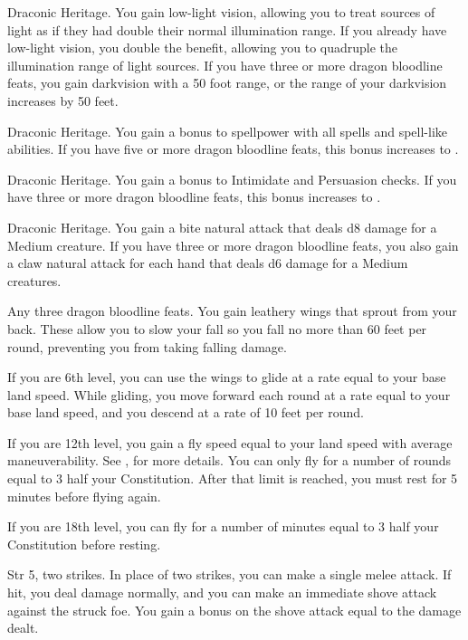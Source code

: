 \featpre Draconic Heritage.
\featben You gain low-light vision, allowing you to treat sources of light as if they had double their normal illumination range.
If you already have low-light vision, you double the benefit, allowing you to quadruple the illumination range of light sources.
If you have three or more dragon bloodline feats, you gain darkvision with a 50 foot range, or the range of your darkvision increases by 50 feet.

\featpre Draconic Heritage.
\featben You gain a  bonus to spellpower with all spells and spell-like abilities.
If you have five or more dragon bloodline feats, this bonus increases to .

\featpre Draconic Heritage.
\featben You gain a  bonus to Intimidate and Persuasion checks.
If you have three or more dragon bloodline feats, this bonus increases to .

\featpre Draconic Heritage.
\featben You gain a bite natural attack that deals d8 damage for a Medium creature.
If you have three or more dragon bloodline feats, you also gain a claw natural attack for each hand that deals d6 damage for a Medium creatures.

\featpre Any three dragon bloodline feats.
\featben You gain leathery wings that sprout from your back.
These allow you to slow your fall so you fall no more than 60 feet per round, preventing you from taking falling damage.

If you are 6th level, you can use the wings to glide at a rate equal to your base land speed.
While gliding, you move forward each round at a rate equal to your base land speed, and you descend at a rate of 10 feet per round.

If you are 12th level, you gain a fly speed equal to your land speed with average maneuverability.
See , for more details.
You can only fly for a number of rounds equal to 3 \add half your Constitution.
After that limit is reached, you must rest for 5 minutes before flying again.

If you are 18th level, you can fly for a number of minutes equal to 3 \add half your Constitution before resting.

\featpres Str 5, two strikes.
\featben In place of two strikes, you can make a single melee attack.
If hit, you deal damage normally, and you can make an immediate shove attack against the struck foe.
You gain a bonus on the shove attack equal to the damage dealt.

